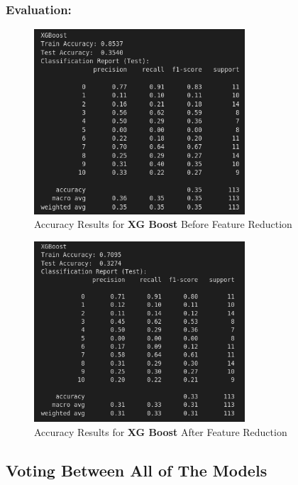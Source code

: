 \documentclass[a4paper,12pt]{article}
\begin{document}
\subsubsection{Evaluation:}
\begin{figure}[H]
    \centering
    \includegraphics[width=0.7\textwidth]{./images/xgacc1.png}
    \caption{Accuracy Results for \textbf{XG Boost} Before Feature Reduction}
    \label{fig:fig_25}
\end{figure}
\begin{figure}[H]
    \centering
    \includegraphics[width=0.7\textwidth]{./images/xgacc2.png}
    \caption{Accuracy Results for \textbf{XG Boost} After Feature Reduction}
    \label{fig:fig_26}
\end{figure}

\subsection{Voting Between All of The Models}
\end{document}
